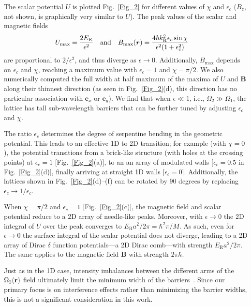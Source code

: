 \documentclass[aps,pra,twocolumn,showpacs,superscriptaddress,floatfix,longbibliography]{revtex4-1}
\def\kr{k_{\mathrm R}}                            			%
\def\Er{E_{\mathrm R}}                            			%
\def\Udd{U}
\def\Bdd{{\mathbf B}}
\def\ex{\boldsymbol{e}_x}
\def\ey{\boldsymbol{e}_y}
\begin{document}
The scalar potential $\Udd$ is plotted Fig.~\ref{Fig_2} for different values of $\chi$ and $\epsilon_c$ ($B_{z}$, not shown, is graphically very similar to $\Udd$).
The peak values of the scalar and magnetic fields
%
\begin{align*}
U_{\text{max}} &= \frac{2 \Er}{\epsilon^2} & {\text{and}\rm} && B_{\text{max}}(\boldsymbol{r}) &= \frac{4 \hbar \kr^2 \epsilon_c \sin{\chi}}{\epsilon^2 (1+\epsilon_c^2)} \,
\end{align*}
%
are proportional to $2/\epsilon^{2}$, and thus diverge as $\epsilon \rightarrow 0$.
Additionally, $B_{\text{max}}$ depends on $\epsilon_c$ and $\chi$, reaching a maximum value with $\epsilon_c = 1$ and $\chi=\pi/2$.
We also numerically computed the full width at half maximum of the maxima of $\Udd$ and $\Bdd$ along their thinnest direction (as seen in Fig.~\ref{Fig_2}(d), this direction has no particular association with $\ex$ or $\ey$).
We find that when $\epsilon\ll1$, i.e., $\Omega_2\gg\Omega_1$, the lattice has tall sub-wavelength barriers that can be further tuned by adjusting $\epsilon_c$ and $\chi$.

The ratio $\epsilon_c$ determines the degree of serpentine bending in the geometric potential.
This leads to an effective 1D to 2D transition; for example (with $\chi=0$), the potential transitions from a brick-like structure (with holes at the crossing points) at $\epsilon_c = 1$ [Fig.~\ref{Fig_2}(a)], to an an array of modulated walls [$\epsilon_c = 0.5$ in Fig.~\ref{Fig_2}(d)], finally arriving at straight 1D walls [$\epsilon_c = 0$].
Additionally, the lattices shown in Fig.~\ref{Fig_2}(d)--(f) can be rotated by 90 degrees by replacing $\epsilon_c \rightarrow 1/\epsilon_c$.

When $\chi=\pi/2$ and $\epsilon_c = 1$ [Fig.~\ref{Fig_2}(c)], the magnetic field and scalar potential reduce to a 2D array of needle-like peaks.
Moreover, with $\epsilon \rightarrow 0$ the 2D integral of $\Udd$ over the peak converges to $\Er a^2 / 2\pi = \hbar^2 \pi / M$.
As such, even for $\epsilon \rightarrow 0$ the surface integral of the scalar potential does not diverge, leading to a 2D array of Dirac $\delta$ function potentials---a 2D Dirac comb---with strength $\Er a^2 / 2\pi$.
The same applies to the magnetic field $\Bdd$ with strength $2 \pi \hbar$.

Just as in the 1D case, intensity imbalances between the different arms of the $\Omega_2({\bf r})$ field ultimately limit the minimum width of the barriers~\cite{Wang2018}.
Since our primary focus is on interference effects rather than minimizing the barrier widths, this is not a significant consideration in this work.
\end{document}
